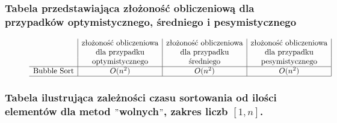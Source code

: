 \documentclass[polish,polish,a4paper]{article}
\begin{document}
\begin{spacing}{1.5}
	
	\subsubsection*{Tabela przedstawiająca złożoność obliczeniową dla przypadków optymistycznego, średniego i pesymistycznego} 
	
	\begin{figure}[H]
			\begin{equation*}
		\begin{array}{l|c|c|c|}

		&$złożoność obliczeniowa$&$złożoność obliczeniowa$&$złożoność obliczeniowa$\\
		&$dla przypadku$&$dla przypadku$&$dla przypadku$\\
		&$optymistycznego$&$średniego$&$pesymistycznego$\\
		\hline
		$Bubble Sort$&O(n^2)&O(n^2)&O(n^2)\\
		\hline
		\end{array}
		\end{equation*}
	\end{figure}

	\subsubsection*{Tabela ilustrująca zależności czasu sortowania od ilości elementów dla metod $"$wolnych$"$, zakres liczb $ [1,n] $.}
	
	\begin{figure}[H]
			\begin{equation*}
		\begin{array}{l|c|c|c|}


\end{array}
\end{equation*}
\end{figure}
\end{spacing}
\end{document}
